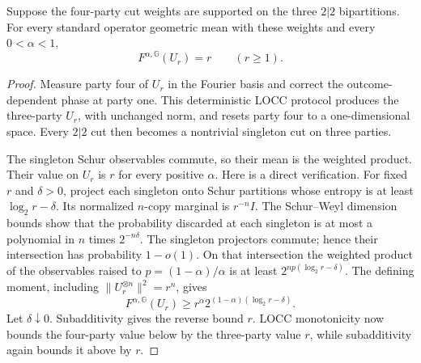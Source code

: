 \begin{lemma}\label{lem:paired-cut-ghz-normalization}
Suppose the four-party cut weights are supported on the three \(2|2\)
bipartitions.  For every standard operator geometric mean with these
weights and every \(0<\alpha<1\),
\[
 F^{\alpha,\mathbb G}(U_r)=r\qquad(r\geq1).
\]
\end{lemma}
\begin{proof}
Measure party four of \(U_r\) in the Fourier basis and correct the
outcome-dependent phase at party one.  This deterministic LOCC protocol
produces the three-party \(U_r\), with unchanged norm, and resets party
four to a one-dimensional space.  Every \(2|2\) cut then becomes a
nontrivial singleton cut on three parties.

The singleton Schur observables commute, so their mean is the weighted
product.  Their value on \(U_r\) is \(r\) for every positive \(\alpha\).
Here is a direct verification.  For fixed \(r\) and \(\delta>0\),
project each singleton onto Schur partitions whose entropy is at least
\(\log_2r-\delta\).  Its normalized \(n\)-copy marginal is \(r^{-n}I\).
The Schur--Weyl dimension bounds show that the probability discarded at
each singleton is at most a polynomial in \(n\) times \(2^{-n\delta}\).
The singleton projectors commute; hence their intersection has
probability \(1-o(1)\).  On that intersection the weighted product of
the observables raised to \(p=(1-\alpha)/\alpha\) is at least
\(2^{np(\log_2r-\delta)}\).
The defining moment, including \(\|U_r^{\otimes n}\|^2=r^n\), gives
\[
 F^{\alpha,\mathbb G}(U_r)
 \geq r^\alpha 2^{(1-\alpha)(\log_2r-\delta)}.
\]
Let \(\delta\downarrow0\).  Subadditivity gives the reverse bound \(r\).
LOCC monotonicity now bounds the four-party value below by the
three-party value \(r\), while subadditivity again bounds it above by \(r\).
\end{proof}


